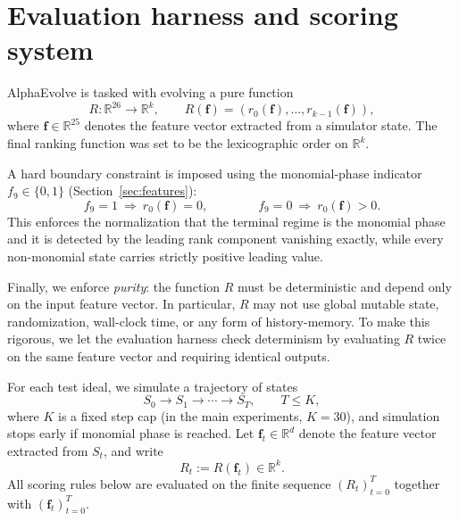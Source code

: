 \documentclass[11pt]{amsart}
\begin{document}
\section{Evaluation harness and scoring system}



AlphaEvolve is tasked with evolving a pure function
\[
R:\mathbb{R}^{26} \longrightarrow \mathbb{R}^k,\qquad
R(\mathbf{f})=(r_0(\mathbf{f}),\dots,r_{k-1}(\mathbf{f})),
\]
where $\mathbf{f}\in\mathbb{R}^{25}$ denotes the feature vector extracted from a simulator state.
The final ranking function was set to be the lexicographic order on $\mathbb{R}^k$.

A hard boundary constraint is imposed using the monomial-phase indicator $f_9\in\{0,1\}$ (Section~\ref{sec:features}):
\begin{equation}\label{eq:monomial-normalization}
f_9=1 \ \Longrightarrow\ r_0(\mathbf{f})=0,
\qquad\qquad
f_9=0 \ \Longrightarrow\ r_0(\mathbf{f})>0.
\end{equation}
This enforces the normalization that the terminal regime is the monomial phase and it is detected by the leading rank component
vanishing exactly, while every non-monomial state carries strictly positive leading value.

Finally, we enforce \emph{purity}: the function $R$ must be deterministic and depend only on the input feature vector.
In particular, $R$ may not use global mutable state, randomization, wall-clock time, or any form of history-memory. To make this rigorous, we let the evaluation harness check determinism by evaluating $R$ twice on the same feature vector
and requiring identical outputs.

For each test ideal, we simulate a trajectory of states
\[
S_0 \to S_1 \to \cdots \to S_T,
\qquad T\le K,
\]
where $K$ is a fixed step cap (in the main experiments, $K=30$), and simulation stops early if monomial phase is reached.
Let $\mathbf{f}_t\in\mathbb{R}^d$ denote the feature vector extracted from $S_t$, and write
\[
R_t := R(\mathbf{f}_t)\in\mathbb{R}^k.
\]
All scoring rules below are evaluated on the finite sequence $(R_t)_{t=0}^T$ together with $(\mathbf{f}_t)_{t=0}^T$.
\end{document}
